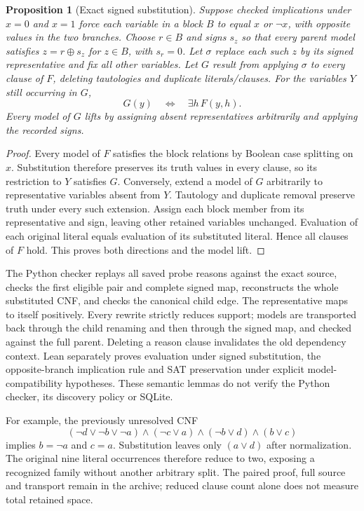 \documentclass[11pt,a4paper]{article}
\numberwithin{equation}{section}
\theoremstyle{plain}
\newtheorem{proposition}[lemma]{Proposition}
\theoremstyle{definition}
\theoremstyle{remark}
\begin{document}
\begin{proposition}[Exact signed substitution]
\label{prop:probe-equivalence}
Suppose checked implications under $x=0$ and $x=1$ force each variable in a block $B$ to equal $x$ or $\neg x$, with opposite values in the two branches. Choose $r\in B$ and signs $s_z$ so that every parent model satisfies $z=r\oplus s_z$ for $z\in B$, with $s_r=0$. Let $\sigma$ replace each such $z$ by its signed representative and fix all other variables. Let $G$ result from applying $\sigma$ to every clause of $F$, deleting tautologies and duplicate literals/clauses. For the variables $Y$ still occurring in $G$,
\[
G(y)\quad\Longleftrightarrow\quad\exists h\,F(y,h).
\]
Every model of $G$ lifts by assigning absent representatives arbitrarily and applying the recorded signs.
\end{proposition}
\begin{proof}
Every model of $F$ satisfies the block relations by Boolean case splitting on $x$. Substitution therefore preserves its truth values in every clause, so its restriction to $Y$ satisfies $G$. Conversely, extend a model of $G$ arbitrarily to representative variables absent from $Y$. Tautology and duplicate removal preserve truth under every such extension. Assign each block member from its representative and sign, leaving other retained variables unchanged. Evaluation of each original literal equals evaluation of its substituted literal. Hence all clauses of $F$ hold. This proves both directions and the model lift.
\end{proof}

The Python checker replays all saved probe reasons against the exact source, checks the first eligible pair and complete signed map, reconstructs the whole substituted CNF, and checks the canonical child edge. The representative maps to itself positively. Every rewrite strictly reduces support; models are transported back through the child renaming and then through the signed map, and checked against the full parent. Deleting a reason clause invalidates the old dependency context. Lean separately proves evaluation under signed substitution, the opposite-branch implication rule and SAT preservation under explicit model-compatibility hypotheses. These semantic lemmas do not verify the Python checker, its discovery policy or SQLite.

For example, the previously unresolved CNF
\[
(\neg d\vee\neg b\vee\neg a)\wedge(\neg c\vee a)
\wedge(\neg b\vee d)\wedge(b\vee c)
\]
implies $b=\neg a$ and $c=a$. Substitution leaves only $(a\vee d)$ after normalization. The original nine literal occurrences therefore reduce to two, exposing a recognized family without another arbitrary split. The paired proof, full source and transport remain in the archive; reduced clause count alone does not measure total retained space.
\end{document}
